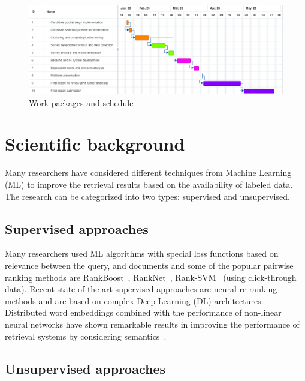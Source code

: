 \documentclass[master,proposal,extern,palatino]{rgseThesis}
\begin{document}
	\begin{figure}[h]
	\centering
	\includegraphics[width=.8\textwidth]{images/work_packages_schedule.png}
	\caption{Work packages and schedule \label{fig:work_packages}}
\end{figure}
	
	
\section{Scientific background}

Many researchers have considered different techniques from Machine Learning (ML) to improve the retrieval results based on the availability of labeled data. The research can be categorized into two types: supervised and unsupervised.

\subsection{Supervised approaches}

 Many researchers used ML algorithms with special loss functions based on relevance between the query, and documents and some of the popular pairwise ranking methods are RankBoost~\cite{freund2003efficient}, RankNet~\cite{burges2005learning}, Rank-SVM~\cite{joachims2002optimizing} (using click-through data). Recent state-of-the-art supervised approaches are neural re-ranking methods and are based on complex Deep Learning (DL) architectures. Distributed word embeddings combined with the performance of non-linear neural networks have shown remarkable results in improving the performance of retrieval systems by considering semantics~\cite{mitra2017learning, guo2016deep, nogueira2019passage}. 

\subsection{Unsupervised approaches}
\end{document}
